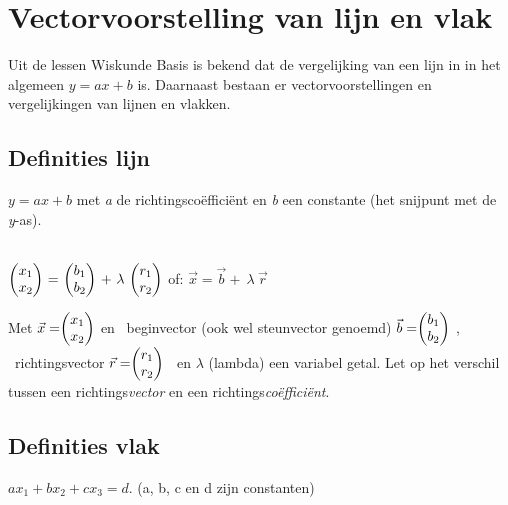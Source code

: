 \section{Vectorvoorstelling van  lijn en  vlak}
Uit de lessen Wiskunde Basis is bekend dat de vergelijking van een lijn in \RT in het algemeen $ y = ax + b $ is.  Daarnaast bestaan er vectorvoorstellingen en vergelijkingen van lijnen en vlakken. 

\subsection{Definities lijn}
  {$ y = ax + b $ 
	\qquad met \textit{a} de richtingscoëfficiënt  en \textit{b} een constante (het snijpunt met de \textit{y}-as).
 }

\\

{ $  \vectweesnel{x} \  = \ \vectweesnel{b} \  + \  \lambda \ \vectweesnel{r} $ 
	\qquad  \qquad of: 
	$ \vec{x}  =   \vec{b}  + \  \lambda \ \vec{r} $} 

Met  $ \vec{x}  =  \vectweesnel{x} $ en 
\ beginvector (ook wel steunvector genoemd) $ \vec{b} =  \vectweesnel{b} $ ,  
\  richtingsvector $ \vec{r} =  \vectweesnel{r} $  \ en
$ \lambda $  (lambda) een variabel getal. Let op het verschil tussen een richtings\textit{vector} en een richtings\textit{coëfficiënt}.\\ 


\subsection{Definities vlak}
{$ ax_1 + bx_2 + cx_3 = d $. \quad  \quad (a, b, c en d zijn constanten) } \\


